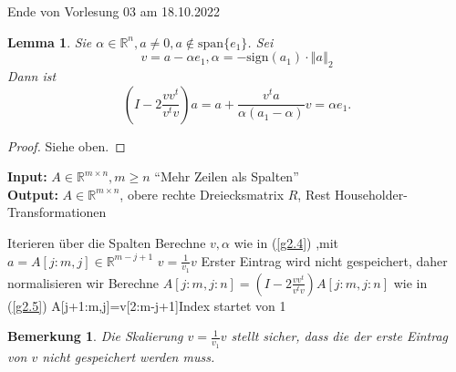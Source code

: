 \documentclass{book}
\newtheorem{lemma}[algorithm]{Lemma}
\newtheorem{remark}[algorithm]{Bemerkung}
\def\R{\mathbb{R}}
\begin{document}
            \noindent
            \xrfill[0.7ex]{1pt}Ende von Vorlesung 03 am 18.10.2022\xrfill[0.7ex]{1pt}
            
            \begin{lemma}\label{l2.18}
                Sie $\alpha\in\R^n,a\neq 0,a\notin\text{span}\{e_1\}$. 
                Sei \begin{equation}\label{g2.4}
                    v=a-\alpha e_1,\alpha =-\text{sign}(a_1)\cdot \left\Vert a \right\Vert_2
                \end{equation} %
                Dann ist
                \begin{equation}\label{g2.5}
                    \left(I-2\frac{vv^t}{v^tv}\right)a=a+\frac{v^ta}{\alpha(a_1-\alpha)}v=\alpha e_1.
                \end{equation}
            \end{lemma}

            \begin{proof}
                Siehe oben.
            \end{proof}

            \begin{algorithm}[H]
                \caption{}\label{a2.19}
                \textbf{Input:} $A\in\R^{m\times n},m\geq n$ ``Mehr Zeilen als Spalten''\\
                \textbf{Output:} $A\in\R^{m\times n}$, obere rechte Dreiecksmatrix $R$, Rest Householder-Transformationen
                \begin{algorithmic}
                 \Comment Iterieren über die Spalten
                    \State Berechne $v,\alpha$ wie in (\ref{g2.4}) ,mit $a=A[j:m,j]\in\R^{m-j+1}$
                    \State $v=\frac{1}{v_1}v$ \Comment Erster Eintrag wird nicht gespeichert, daher normalisieren wir
                    \State Berechne $A[j:m,j:n]=\left(I-2\frac{vv^t}{v^tv}\right)A[j:m,j:n]$ wie in (\ref{g2.5})
                        \State A[j+1:m,j]=v[2:m-j+1]\Comment Index startet von 1 
                    \EndIf
                \EndFor
                \end{algorithmic}
            \end{algorithm}

            \begin{remark}\label{b2.20}
                Die Skalierung $v=\frac{1}{v_1}v$ stellt sicher, dass die der erste Eintrag von $v$ nicht gespeichert werden muss.
            \end{remark}
\end{document}
